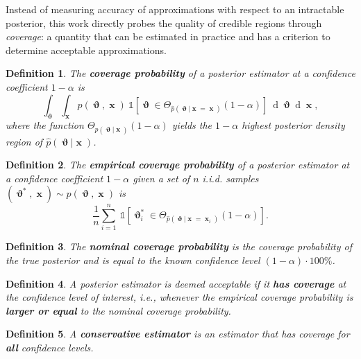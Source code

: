 \documentclass[twoside]{article}
\newtheorem{definition}{Definition}
\DeclareMathOperator{\vtheta}{\boldsymbol\vartheta}
\DeclareMathOperator{\vx}{\boldsymbol x}
\renewcommand*{\d}[1]{\operatorname{d}\!{#1}}
\begin{document}
Instead of measuring accuracy of approximations with respect to an intractable posterior, this work directly probes
the quality of credible regions through \emph{coverage}: a quantity that can be estimated in practice and has a criterion to determine acceptable approximations.
\begin{definition}
The {\bfseries coverage probability} of a posterior estimator at a confidence coefficient $1 - \alpha$ is
\begin{equation}
    \int_{\vtheta}\int_{\vx} p(\vtheta,\vx)~\mathbb{1}\left[\vtheta \in \Theta_{\hat{p}(\vtheta|\vx = \vx)}(1 - \alpha)\right]~\d\vtheta\d\vx,
\end{equation}
where the function
$\Theta_{p(\vtheta\vert\vx)}(1 - \alpha)$ yields the $1 - \alpha$ highest posterior density region
of $\hat{p}(\vtheta\vert\vx)$.
\end{definition}
\begin{definition}
The {\bfseries empirical coverage probability} of a posterior estimator at a confidence coefficient $1 - \alpha$ given a set of $n$ i.i.d. samples $(\vtheta^*,\vx)\sim p(\vtheta,\vx)$
is
\begin{equation}
\frac{1}{n} \sum_{i=1}^n ~\mathbb{1}\left[\vtheta^*_i \in \Theta_{\hat{p}(\vtheta|\vx = \vx_i)}(1 - \alpha)\right].
\end{equation}
\end{definition}
\begin{definition}
The {\bfseries nominal coverage probability} is the coverage probability of the true posterior and is equal to the known confidence level $(1 - \alpha)\cdot 100\%$.
\end{definition}
\begin{definition}
A posterior estimator is deemed acceptable if it {\bfseries has coverage} at the confidence level of interest, i.e., whenever the empirical coverage probability is {\bfseries larger or equal} to the nominal coverage probability.
\end{definition}
\begin{definition}
A {\bfseries conservative estimator} is an estimator that has coverage for {\bfseries all} confidence levels.
\end{definition}
\end{document}
